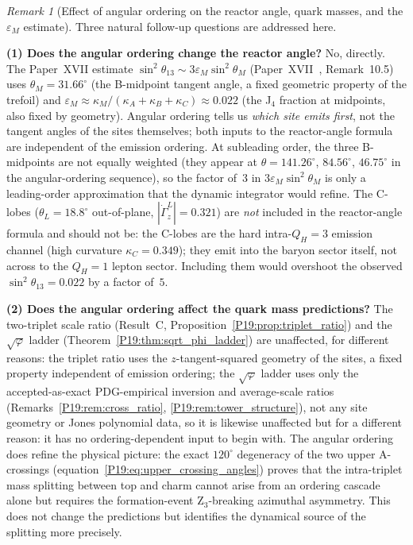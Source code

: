 \documentclass[11pt,a4paper]{article}
\theoremstyle{definition}\newtheorem{definition}[theorem]{Definition}
\theoremstyle{remark}
\newtheorem{remark}[theorem]{Remark}
\newcommand{\vp}{\varphi}
\newcommand{\QH}{Q_H}
\newcommand{\tang}{\dot\Gamma}
\begin{document}
\begin{remark}[Effect of angular ordering on the reactor angle, quark masses,
  and the $\varepsilon_M$ estimate]
\label{P19:rem:angular_ordering_impact}
Three natural follow-up questions are addressed here.

\textbf{(1) Does the angular ordering change the reactor angle?}
No, directly.  The Paper~XVII estimate
$\sin^2\theta_{13}\sim 3\varepsilon_M\sin^2\theta_M$
(Paper~XVII~\cite{Paper17}, Remark~10.5) %
uses $\theta_M=31.66^\circ$ (the B-midpoint tangent angle, a fixed
geometric property of the trefoil) and
$\varepsilon_M\approx\kappa_M/(\kappa_A+\kappa_B+\kappa_C)\approx0.022$
(the J$_4$ fraction at midpoints, also fixed by geometry).
Angular ordering tells us \emph{which site emits first}, not the tangent
angles of the sites themselves; both inputs to the reactor-angle formula
are independent of the emission ordering.  At subleading order,
the three B-midpoints are not equally weighted (they appear at
$\theta=141.26^\circ$, $84.56^\circ$, $46.75^\circ$ in the angular-ordering
sequence), so the factor of~$3$ in $3\varepsilon_M\sin^2\theta_M$ is
only a leading-order approximation that the dynamic integrator would
refine.  The C-lobes ($\theta_L=18.8^\circ$ out-of-plane, $|\tang_z^L|=0.321$)
are \emph{not} included in the reactor-angle formula and should not be:
the C-lobes are the hard intra-$\QH=3$ emission channel (high curvature
$\kappa_C=0.349$); they emit into the baryon sector itself, not across to
the $\QH=1$ lepton sector.  Including them would overshoot the observed
$\sin^2\theta_{13}=0.022$ by a factor of~$5$.

\textbf{(2) Does the angular ordering affect the quark mass predictions?}
The two-triplet scale ratio (Result~C,
Proposition~\ref{P19:prop:triplet_ratio}) and the $\sqrt{\vp}$ ladder
(Theorem~\ref{P19:thm:sqrt_phi_ladder}) are unaffected, for different
reasons: the triplet ratio uses the $z$-tangent-squared geometry of
the sites, a fixed property independent of emission ordering; the
$\sqrt{\vp}$ ladder uses only the accepted-as-exact PDG-empirical
inversion and average-scale ratios (Remarks~\ref{P19:rem:cross_ratio},
\ref{P19:rem:tower_structure}), not any site geometry or Jones
polynomial data, so it is likewise unaffected but for a different
reason: it has no ordering-dependent input to begin with.
The angular ordering does refine the physical picture: the exact
$120^\circ$ degeneracy of the two upper A-crossings
(equation~\eqref{P19:eq:upper_crossing_angles}) proves that the
intra-triplet mass splitting between top and charm cannot arise from
an ordering cascade alone but requires the formation-event Z$_3$-breaking
azimuthal asymmetry.  This does not change the predictions but
identifies the dynamical source of the splitting more precisely.


\end{remark}
\end{document}
